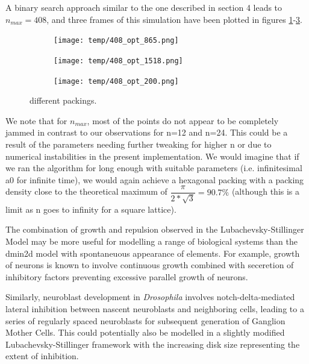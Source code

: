 \documentclass{article}
\begin{document}
A binary search approach similar to the one described in section 4 leads to  $n_{max} = 408$, and three frames of this simulation have been plotted in figures \ref{fig:sat_1}-\ref{fig:sat_3}.

\begin{figure}[h]
	\centering
	\begin{subfigure}[t]{0.31\linewidth}
		\centering
		\texttt{[image: temp/408\_opt\_865.png]}
		\label{fig:sat_1}	
	\end{subfigure}
	\hspace{0.01\linewidth}
	\begin{subfigure}[t]{0.31\linewidth}
		\centering
		\texttt{[image: temp/408\_opt\_1518.png]}
		\label{fig:sat_2}	
	\end{subfigure}
	\hspace{0.02\linewidth}
	\begin{subfigure}[t]{0.31\linewidth}
		\centering
		\texttt{[image: temp/408\_opt\_200.png]}
		\label{fig:sat_3}	
	\end{subfigure}
\label{fig:models}
\caption{different packings.}
\end{figure}

We note that for $n_{max}$, most of the points do not appear to be completely jammed in contrast to our observations for n=12 and n=24. This could be a result of the parameters needing further tweaking for higher n or due to numerical instabilities in the present implementation. We would imagine that if we ran the algorithm for long enough with suitable parameters (i.e. infinitesimal a0 for infinite time), we would again achieve a hexagonal packing with a packing density close to the theoretical maximum of $\dfrac{\pi}{2*\sqrt{3}} = 90.7\%$ (although this is a limit as n goes to infinity for a square lattice).

The combination of growth and repulsion observed in the Lubachevsky-Stillinger Model may be more useful for modelling a range of biological systems than the dmin2d model with spontaneuous appearance of elements. For example, growth of neurons is known to involve continuous growth combined with seceretion of inhibitory factors preventing excessive parallel growth of neurons.

Similarly, neuroblast development in \textit{Drosophila} involves notch-delta-mediated lateral inhibition between nascent neuroblasts and neighboring cells, leading to a series of regularly spaced neuroblasts for subsequent generation of Ganglion Mother Cells. This could potentially also be modelled in a slightly  modified Lubachevsky-Stillinger framework with the increasing disk size representing the extent of inhibition.
\end{document}
